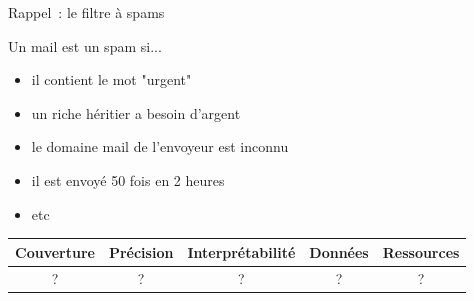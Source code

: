 \documentclass[serif, aspectratio=169]{beamer}
\begin{document}
\begin{frame}{Rappel~: le filtre à spams}
    \begin{block}{Un mail est un spam si...}
        \begin{itemize}
            \item il contient le mot "urgent"
            \item un riche héritier a besoin d'argent
            \item le domaine mail de l'envoyeur est inconnu
            \item il est envoyé 50 fois en 2 heures
            \item etc
        \end{itemize}
    \end{block}
    \vfill
    \pause
    \begin{table}
        \centering
        \renewcommand{\arraystretch}{1.5}  
        \begin{tabular}{|c|c|c|c|c|}
            \hline
            Couverture & Précision & Interprétabilité & Données & Ressources \\
            \hline
            ?          & ?         & ?                & ?       & ?          \\
            \hline
        \end{tabular}
    \end{table}
\end{frame}
\end{document}
